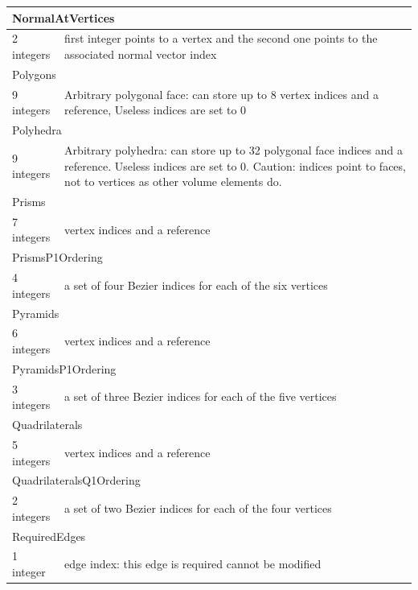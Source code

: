\documentclass[a4paper,12pt]{article}
\begin{document}
\begin{longtable}{|m{4cm}|m{11cm}|}
\multicolumn{2}{|l|}{NormalAtVertices} \\
\hline
2 integers & first integer points to a vertex and the second one points to the associated normal vector index \\
\hline\hline

\multicolumn{2}{|l|}{Polygons} \\
\hline
9 integers & Arbitrary polygonal face: can store up to 8 vertex indices and a reference, Useless indices are set to 0 \\
\hline\hline

\multicolumn{2}{|l|}{Polyhedra} \\
\hline
9 integers & Arbitrary polyhedra: can store up to 32 polygonal face indices and a reference. Useless indices are set to 0. Caution: indices point to faces, not to vertices as other volume elements do. \\
\hline\hline

\multicolumn{2}{|l|}{Prisms} \\
\hline
7 integers & vertex indices and a reference \\
\hline\hline

\multicolumn{2}{|l|}{PrismsP1Ordering} \\
\hline
4 integers & a set of four Bezier indices for each of the six vertices \\
\hline\hline

\multicolumn{2}{|l|}{Pyramids} \\
\hline
6 integers & vertex indices and a reference \\
\hline\hline

\multicolumn{2}{|l|}{PyramidsP1Ordering} \\
\hline
3 integers & a set of three Bezier indices for each of the five vertices \\
\hline\hline

\multicolumn{2}{|l|}{Quadrilaterals} \\
\hline
5 integers & vertex indices and a reference \\
\hline\hline

\multicolumn{2}{|l|}{QuadrilateralsQ1Ordering} \\
\hline
2 integers & a set of two Bezier indices for each of the four vertices \\
\hline\hline

\multicolumn{2}{|l|}{RequiredEdges} \\
\hline
1 integer & edge index: this edge is required cannot be modified \\
\hline\hline


\end{longtable}
\end{document}
